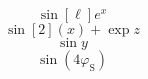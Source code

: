\documentclass{article}
\newcommand\phis{\varphi_\mathrm{S}}
\begin{document}
\[ \sin[\ell] {e}^{x} \]
\[ \sin[2](x) + \exp{z} \]
\[ \sin{y} \]
\[ \sin{(4\phis)} \]
\end{document}
